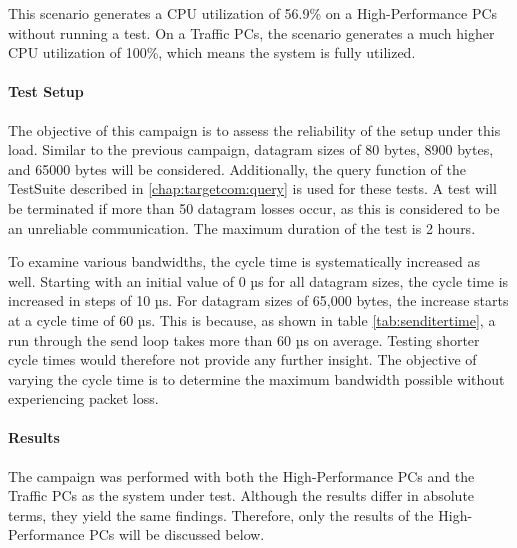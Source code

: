 This scenario generates a CPU utilization of 56.9\% on a High-Performance PCs without running a test. On a Traffic PCs, the scenario generates a much higher CPU utilization of 100\%, which means the system is fully utilized.

\paragraph{Test Setup}
The objective of this campaign is to assess the reliability of the setup under this load. Similar to the previous campaign, datagram sizes of 80 bytes, 8900 bytes, and 65000 bytes will be considered. Additionally, the query function of the TestSuite described in \ref{chap:targetcom:query} is used for these tests. A test will be terminated if more than 50 datagram losses occur, as this is considered to be an unreliable communication. The maximum duration of the test is 2 hours.

To examine various bandwidths, the cycle time is systematically increased as well. Starting with an initial value of 0 µs for all datagram sizes, the cycle time is increased in steps of 10 µs. For datagram sizes of 65,000 bytes, the increase starts at a cycle time of 60 µs. This is because, as shown in table \ref{tab:senditertime}, a run through the send loop takes more than 60 µs on average. Testing shorter cycle times would therefore not provide any further insight. The objective of varying the cycle time is to determine the maximum bandwidth possible without experiencing packet loss.

\paragraph{Results}
The campaign was performed with both the High-Performance PCs and the Traffic PCs as the system under test. Although the results differ in absolute terms, they yield the same findings. Therefore, only the results of the High-Performance PCs will be discussed below.

